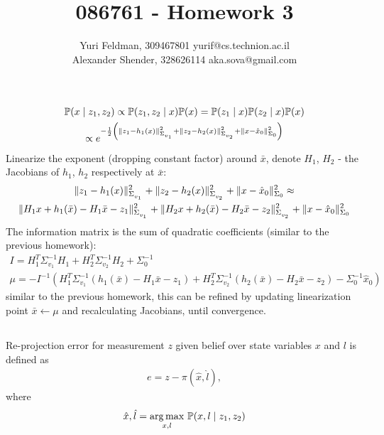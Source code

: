 \documentclass[a4paper]{scrreprt}
\title{086761 - Homework 3}
\author{Yuri Feldman, 309467801 yurif@cs.technion.ac.il \\
	    Alexander Shender, 328626114 aka.sova@gmail.com }
\begin{document}
\maketitle
\chapter{}
\section{}
\begin{gather}
	\prob{x\mid z_1, z_2} \propto \prob{z_1, z_2\mid x} \prob{x} 
	= \prob{z_1\mid x} \prob{z_2\mid x} \prob{x} \\
	\propto e^{-\frac{1}{2}\left(
	\nrmsq{\Sigma_{_{v_1}}}{z_1-h_1(x)}
	+\nrmsq{\Sigma_{_{v_2}}}{z_2-h_2(x)}
	+ \nrmsq{\Sigma_0}{x-\hat{x}_0}
	\right)}
\end{gather}
Linearize the exponent (dropping constant factor) around $\bar{x}$, denote 
$H_1$, 
$H_2$ - the Jacobians of 
$h_1$, $h_2$ respectively at $\bar{x}$: 
\begin{gather}
	\nrmsq{\Sigma_{_{v_1}}}{z_1-h_1(x)}
	+\nrmsq{\Sigma_{_{v_2}}}{z_2-h_2(x)}
	+ \nrmsq{\Sigma_0}{x-\hat{x}_0}
	\approx \\
	\nrmsq{\Sigma_{_{v_1}}}{H_1x+h_1(\bar{x})-H_1\bar{x}-z_1}
	+\nrmsq{\Sigma_{_{v_2}}}{H_2x+h_2(\bar{x})-H_2\bar{x}-z_2}
	+ \nrmsq{\Sigma_0}{x-\hat{x}_0}	
\end{gather}
The information matrix is the sum of quadratic coefficients (similar to the 
previous homework): 
\begin{gather}
	I = H_1^T\Sigma^{-1}_{v_1}H_1 + H_2^T\Sigma^{-1}_{v_2}H_2 + \Sigma_0^{-1} \\
	\mu = -I^{-1} 
	\left(
	H_1^T\Sigma^{-1}_{v_1}(h_1(\bar{x})-H_1\bar{x}-z_1)
	+H_2^T\Sigma^{-1}_{v_2}(h_2(\bar{x})-H_2\bar{x}-z_2)
	-\Sigma_0^{-1}\hat{x}_0
	\right)
\end{gather}
similar to the previous homework, this can be refined by updating linearization 
point $\bar{x}\gets \mu$ and recalculating Jacobians, until convergence. 

\section{}
Re-projection error for measurement $z$ given belief over state 
variables $x$ 
and $l$ is defined as
\begin{gather}
	e = z - \pi\left(\hat{x}, \hat{l}\right),
\end{gather}
where 
\begin{gather}
	\hat{x},\hat{l} = \argmax_{x,l}\,\blf{x,l\mid z_1, z_2}
\end{gather}
\end{document}
